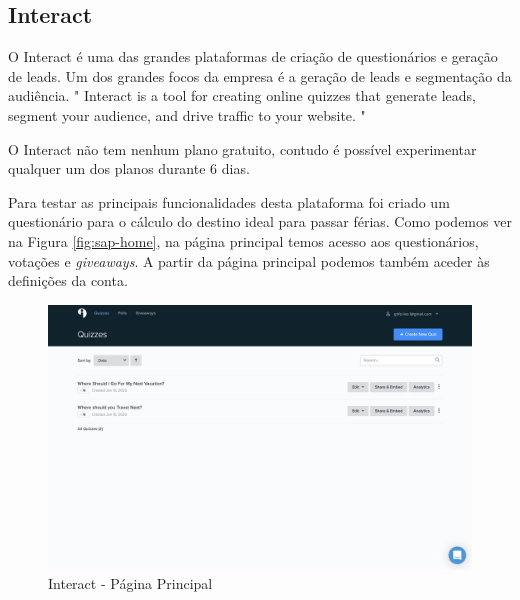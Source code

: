 \subsection{Interact}
\label{interact}

O Interact é uma das grandes plataformas de criação de questionários e geração de leads. Um dos grandes focos da empresa é a geração de leads e segmentação da audiência. " Interact is a tool for creating online quizzes that generate leads, segment your audience, and drive traffic to your website. "

O Interact não tem nenhum plano gratuito, contudo é possível experimentar qualquer um dos planos durante 6 dias. 

Para testar as principais funcionalidades desta plataforma foi criado um questionário para o cálculo do destino ideal para passar férias. Como podemos ver na Figura \ref{fig:sap-home}, na página principal temos acesso aos questionários, votações e \textit{giveaways}. A partir da página principal podemos também aceder às definições da conta.

\newpage

\begin{figure}[ht!]
	\begin{center}
		\includegraphics[width=1\textwidth]{img/interact/home}
		\caption{Interact - Página Principal}
		\label{fig:interact-home}
	\end{center}
\end{figure}

